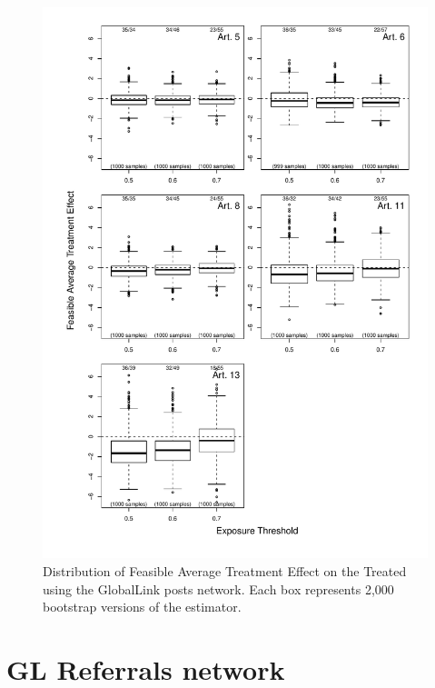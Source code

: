 \documentclass[10pt]{article}
\begin{document}
\begin{figure}[H]
	\centering
	\includegraphics[width=.8\linewidth]{../fig/matching_bloxplot_adjmat_gl_posts.pdf}
	\caption{Distribution of Feasible Average Treatment Effect on the Treated using the GlobalLink posts network. Each box represents 2,000 bootstrap versions of the estimator.}
\end{figure}


\section{GL Referrals network}
\end{document}

